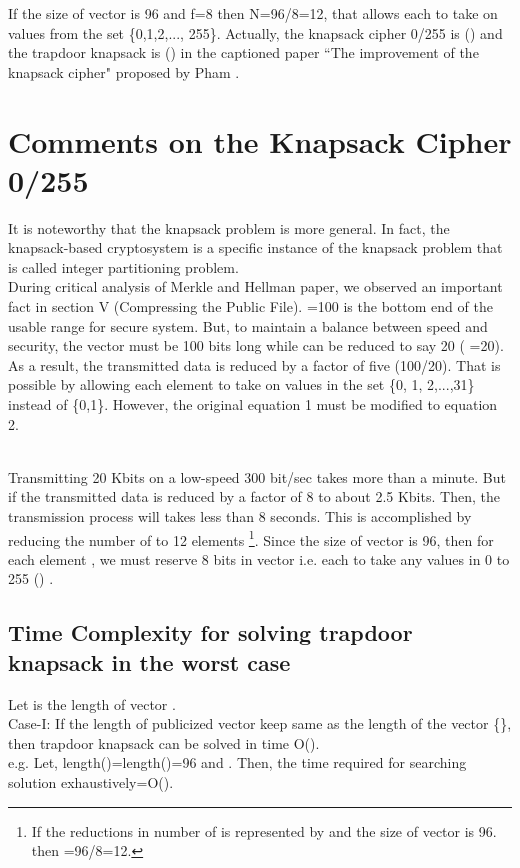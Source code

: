 \documentclass[5p,times,twocolumn]{elsarticle}
\begin{document}
If the size of vector  is 96 and f=8 then N=96/8=12, that allows each  to take on values from the set \{0,1,2,..., 255\}. Actually, the knapsack cipher 0/255 is () and the trapdoor knapsack is () in the captioned paper ``The improvement of the knapsack cipher"  proposed by Pham \cite{pham2011improvement}. 


\section{Comments on the Knapsack Cipher 0/255}
\label{sec:3}
It is noteworthy that the knapsack problem is more general. In fact, the knapsack-based cryptosystem is a specific instance of the knapsack problem that is called integer partitioning problem. \\
\indent During critical analysis of Merkle and Hellman paper\cite{merkle1978hiding}, we observed an important fact in section V (Compressing the Public File).
=100 is the bottom end of the usable range for secure system. But, to maintain a balance between speed and security, the vector  must be 100 bits long while  can be reduced to say 20 ( =20). As a result, the transmitted data is reduced by a factor of five (100/20). That is possible by allowing each element  to take on values in the set \{0, 1, 2,...,31\} instead of \{0,1\}. However, the original equation 1 must be modified to equation 2.


\\ 
Transmitting 20 Kbits on a low-speed 300 bit/sec takes more than a minute. But if the transmitted data is reduced by a factor of 8 to about 2.5 Kbits. Then, the transmission process will  takes less than 8 seconds. This is accomplished by reducing the number of  to 12 elements \footnote{If the reductions in number of  is represented by  and the size of vector  is 96. then =96/8=12.}. Since the size of vector  is 96, then for each element , we must reserve 8 bits in vector  i.e. each  to take any values in 0 to 255 () .

\subsection{Time Complexity for solving trapdoor knapsack in the worst case}
Let  is the length of vector .\\

Case-I: If the length of publicized vector  keep same as the length of the vector  \{\}, then trapdoor knapsack  can be solved in time O().\\
e.g. Let, length()=length()=96 and . Then, the time required for searching solution exhaustively=O().\\  
\end{document}
